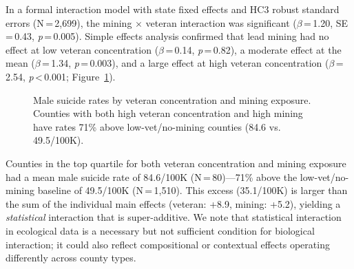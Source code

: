 \documentclass[11pt,twocolumn]{article}
\begin{document}
In a formal interaction model with state fixed effects and HC3 robust standard errors (N\,=\,2,699), the mining $\times$ veteran interaction was significant ($\beta$\,=\,1.20, SE\,=\,0.43, \textit{p}\,=\,0.005). Simple effects analysis confirmed that lead mining had no effect at low veteran concentration ($\beta$\,=\,0.14, \textit{p}\,=\,0.82), a moderate effect at the mean ($\beta$\,=\,1.34, \textit{p}\,=\,0.003), and a large effect at high veteran concentration ($\beta$\,=\,2.54, \textit{p}\,<\,0.001; Figure~\ref{fig:triple}).

\begin{figure}[H]
\centering
{}
\caption{Male suicide rates by veteran concentration and mining exposure. Counties with both high veteran concentration and high mining have rates 71\% above low-vet/no-mining counties (84.6 vs. 49.5/100K).}
\label{fig:triple}
\end{figure}

Counties in the top quartile for both veteran concentration and mining exposure had a mean male suicide rate of 84.6/100K (N\,=\,80)---71\% above the low-vet/no-mining baseline of 49.5/100K (N\,=\,1,510). This excess (35.1/100K) is larger than the sum of the individual main effects (veteran: +8.9, mining: +5.2), yielding a \textit{statistical} interaction that is super-additive. We note that statistical interaction in ecological data is a necessary but not sufficient condition for biological interaction; it could also reflect compositional or contextual effects operating differently across county types.
\end{document}
